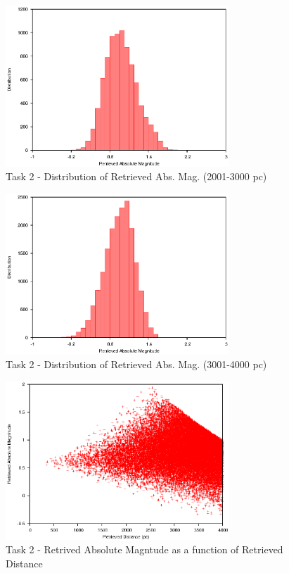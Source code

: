 \documentclass[a4paper,12pt]{article}
\begin{document}
\begin{figure}[H]
\centering
\includegraphics[width=0.75\textwidth]{./Task2/Bin3}
\caption{Task 2 - Distribution of Retrieved Abs. Mag. (2001-3000 pc)}
\label{fig:t2bin3}
\end{figure}

\begin{figure}[H]
\centering
\includegraphics[width=0.75\textwidth]{./Task2/Bin4}
\caption{Task 2 - Distribution of Retrieved Abs. Mag. (3001-4000 pc)}
\label{fig:t2bin4}
\end{figure}

\begin{figure}[H]
\centering
\includegraphics[width=0.75\textwidth]{./Task2/Graph1}
\caption{Task 2 - Retrived Absolute Magntude as a function of Retrieved Distance}
\label{fig:t2graph1}
\end{figure}
\end{document}
